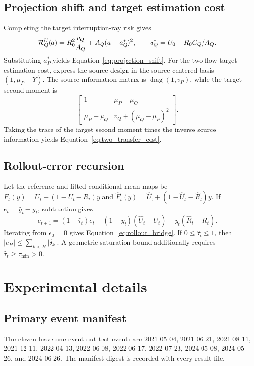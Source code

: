\subsection{Projection shift and target estimation cost}
Completing the target interruption-ray risk gives
\[
\mathcal{R}_Q^U(a)=R_0^2\frac{v_Q}{A_Q}+A_Q(a-a_Q^*)^2,
\qquad a_Q^*=U_0-R_0C_Q/A_Q.
\]
Substituting $a_P^*$ yields Equation~\eqref{eq:projection_shift}. For the two-flow target estimation cost, express the source design in the source-centered basis $(1,\mu_P-Y)$. The source information matrix is $\operatorname{diag}(1,v_P)$, while the target second moment is
\[
\begin{bmatrix}
1&\mu_P-\mu_Q\\
\mu_P-\mu_Q&v_Q+(\mu_Q-\mu_P)^2
\end{bmatrix}.
\]
Taking the trace of the target second moment times the inverse source information yields Equation~\eqref{eq:two_transfer_cost}.

\subsection{Rollout-error recursion}
Let the reference and fitted conditional-mean maps be $F_t(y)=U_t+(1-U_t-R_t)y$ and $\widehat F_t(y)=\widehat U_t+(1-\widehat U_t-\widehat R_t)y$. If $e_t=\widehat y_t-\bar y_t$, subtraction gives
\[
e_{t+1}=(1-\widehat\tau_t)e_t+
(1-\bar y_t)(\widehat U_t-U_t)-\bar y_t(\widehat R_t-R_t).
\]
Iterating from $e_0=0$ gives Equation~\eqref{eq:rollout_bridge}. If $0\le\widehat\tau_t\le1$, then $|e_H|\le\sum_{k<H}|\delta_k|$. A geometric saturation bound additionally requires $\widehat\tau_t\ge\tau_{\min}>0$.

\section{Experimental details}

\subsection{Primary event manifest}
The eleven leave-one-event-out test events are 2021-05-04, 2021-06-21, 2021-08-11, 2021-12-11, 2022-04-13, 2022-06-08, 2022-06-17, 2022-07-23, 2024-05-08, 2024-05-26, and 2024-06-26. The manifest digest is recorded with every result file.

